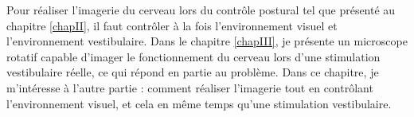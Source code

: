 
Pour réaliser l'imagerie du cerveau lors du contrôle postural tel que présenté au chapitre \ref{chapII}, il faut contrôler à la fois l'environnement visuel et l'environnement vestibulaire.
Dans le chapitre \ref{chapIII}, je présente un microscope rotatif capable d'imager le fonctionnement du cerveau lors d'une stimulation vestibulaire réelle, ce qui répond en partie au problème. Dans ce chapitre, je m'intéresse à l'autre partie : comment réaliser l'imagerie tout en contrôlant l'environnement visuel, et cela en même temps qu'une stimulation vestibulaire.


